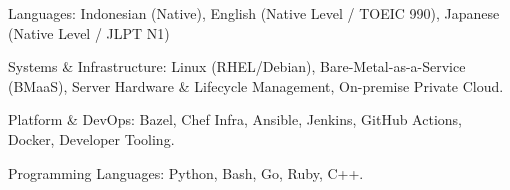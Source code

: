

\begin{cvparagraph}

\begin{cvbullets}
    \item Languages: Indonesian (Native), English (Native Level / TOEIC 990), Japanese (Native Level / JLPT N1)
    \item Systems \& Infrastructure: Linux (RHEL/Debian), Bare-Metal-as-a-Service (BMaaS),
    Server Hardware \& Lifecycle Management, On-premise Private Cloud.
    \item Platform \& DevOps: Bazel, Chef Infra, Ansible, Jenkins, GitHub Actions, Docker, Developer Tooling.
    \item Programming Languages: Python, Bash, Go, Ruby, C++.
\end{cvbullets}
\end{cvparagraph}
